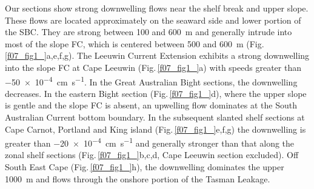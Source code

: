 \documentclass[preprint,3p,review,12pt]{elsarticle}
\begin{document}
Our sections show strong downwelling flows
near the shelf break and upper slope.
These flows are located approximately
on the seaward side and lower portion of the SBC\@.
They are strong between \num{100} and \SI{600}{\meter} and generally intrude into most of the slope FC, which is centered between \num{500} and \SI{600}{\meter} (Fig.\,\ref{f07_fig1_}a,e,f,g). The Leeuwin Current Extension exhibits a strong downwelling into the slope FC at Cape Leeuwin (Fig.\,\ref{f07_fig1_}a) with speeds greater than \SI{-50 e-4}{\centi\meter\per\second}.
In the Great Australian Bight sections, the downwelling decreases. In the eastern Bight section (Fig.\,\ref{f07_fig1_}d), where the upper slope is gentle and the slope FC is absent, an upwelling flow dominates at the South Australian Current bottom boundary. In the subsequent slanted shelf sections at Cape Carnot, Portland and King island (Fig.\,\ref{f07_fig1_}e,f,g) the downwelling is greater than \SI{-20 e-4}{\centi\meter\per\second} and generally stronger than that along the zonal shelf sections (Fig.\,\ref{f07_fig1_}b,c,d, Cape Leeuwin section excluded). Off South East Cape (Fig.\,\ref{f07_fig1_}h), the downwelling dominates the upper \SI{1000}{\meter} and flows through the onshore portion of the Tasman Leakage.
%
\end{document}
